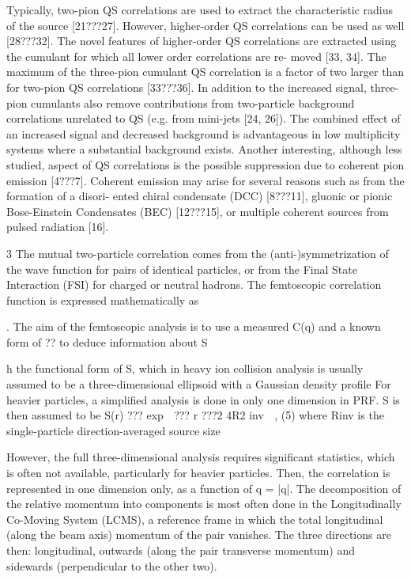 Typically, two-pion QS correlations are used to extract the characteristic radius of the source [21???27]. However,
higher-order QS correlations can be used as well [28???32]. The novel features of higher-order
QS correlations are extracted using the cumulant for which all lower order correlations are re-
moved [33, 34]. The maximum of the three-pion cumulant QS correlation is a factor of two
larger than for two-pion QS correlations [33???36]. In addition to the increased signal, three-pion
cumulants also remove contributions from two-particle background correlations unrelated to
QS (e.g. from mini-jets [24, 26]). The combined effect of an increased signal and decreased
background is advantageous in low multiplicity systems where a substantial background exists.
Another interesting, although less studied, aspect of QS correlations is the possible suppression due to coherent pion emission
[4???7]. Coherent emission may arise for several reasons such as from the formation of a disori-
ented chiral condensate (DCC) [8???11], gluonic or pionic Bose-Einstein Condensates (BEC)
[12???15], or multiple coherent sources from pulsed radiation [16].

3
The mutual two-particle correlation comes from
the (anti-)symmetrization of the wave function for pairs of identical particles,
or from the Final State Interaction (FSI) for charged or neutral hadrons.
The femtoscopic correlation function is expressed mathematically as

. The aim of the femtoscopic analysis is to use
a measured C(q) and a known form of ?? to deduce information about S

h the functional
form of S, which in heavy ion collision analysis is usually assumed to be a
three-dimensional ellipsoid with a Gaussian density profile
For heavier particles, a simplified analysis is done in only one dimension
in PRF. S is then assumed to be
S(r) ??? exp 
???
r
???2
4R2
inv

, (5)
where Rinv is the single-particle direction-averaged source size

However, the full
three-dimensional analysis requires significant statistics, which is often not
available, particularly for heavier particles. Then, the correlation is represented
in one dimension only, as a function of q = |q|. The decomposition
of the relative momentum into components is most often done in the Longitudinally
Co-Moving System (LCMS), a reference frame in which the total
longitudinal (along the beam axis) momentum of the pair vanishes. The
three directions are then: longitudinal, outwards (along the pair transverse
momentum) and sidewards (perpendicular to the other two).

